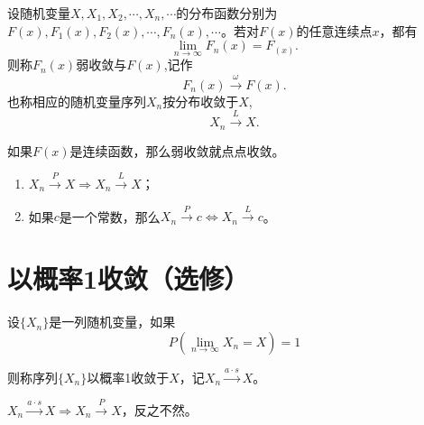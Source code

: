 \begin{definition}
设随机变量$X, X_{1}, X_{2}, \cdots, X_{n}, \cdots$的分布函数分别为$F(x),F_1(x),F_2(x),\cdots,F_n(x),\cdots$。若对$F(x)$的任意连续点$x$，都有
$$\lim _{n \rightarrow \infty} F_{n}(x)=F_{(x)}.$$
则称$F_n(x)$弱收敛与$F(x)$,记作
$$F_{n}(x) \stackrel{\omega}{\longrightarrow} F(x).$$
也称相应的随机变量序列${X_n}$按分布收敛于$X$,
$$X_{n} \stackrel{L}{\longrightarrow} X.$$
\end{definition}
如果$F(x)$是连续函数，那么弱收敛就点点收敛。

\begin{property}
\begin{enumerate}
    \item $X_{n} \stackrel{P}{\rightarrow} X \Rightarrow X_{n} \stackrel{L}{\rightarrow} X$；
    \item 如果$c$是一个常数，那么$X_{n} \stackrel{P}{\rightarrow} c \Leftrightarrow X_{n} \stackrel{L}{\rightarrow} c$。
\end{enumerate}
\end{property}

\section{以概率1收敛（选修）}

\begin{definition}
设$\{X_n\}$是一列随机变量，如果
$$P\left(\lim _{n \rightarrow \infty} X_{n}=X\right)=1$$

则称序列$\{X_n\}$以概率1收敛于$X$，记$X_{n} \stackrel{a \cdot s}{\rightarrow} X$。
\end{definition}
\begin{property}
$X_{n} \stackrel{a \cdot s}{\rightarrow} X \Rightarrow X_{n} \stackrel{P}{\rightarrow} X$，反之不然。
\end{property}

